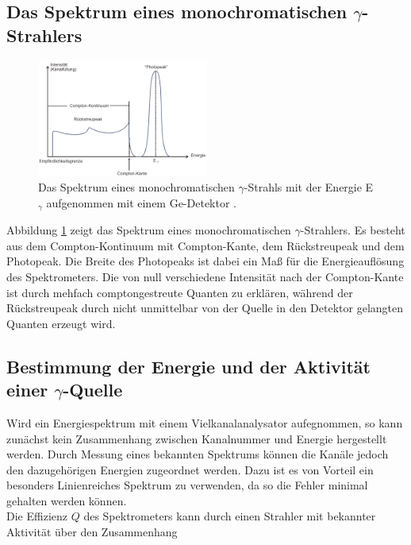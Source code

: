 \FloatBarrier

\subsection{Das Spektrum eines monochromatischen $\gamma$-Strahlers} %
\label{sub:das_von_einem_ge_detektor_erzeugt_spektrum_eines_monochromatischen_gamma_strahlers}

\begin{figure}
	\centering
	\includegraphics[width = 0.5\textwidth]{pic/spek.png}
	\caption{Das Spektrum eines monochromatischen $\gamma$-Strahls mit der Energie E$_\gamma$ aufgenommen mit einem Ge-Detektor \cite{anleitung}.}
	\label{spek}
\end{figure}

Abbildung \ref{spek} zeigt das Spektrum eines monochromatischen $\gamma$-Strahlers.
Es besteht aus dem Compton-Kontinuum mit Compton-Kante, dem Rückstreupeak und dem Photopeak.
Die Breite des Photopeaks ist dabei ein Maß für die Energieauflösung des Spektrometers.
Die von null verschiedene Intensität nach der Compton-Kante ist durch mehfach comptongestreute Quanten zu erklären,
während der Rückstreupeak durch nicht unmittelbar von der Quelle in den Detektor gelangten Quanten erzeugt wird.
\FloatBarrier
\subsection{Bestimmung der Energie und der Aktivität einer $\gamma$-Quelle} %
\label{sub:bestimmung_der_energie_und_der_aktivität_einer_gamma_quelle}

Wird ein Energiespektrum mit einem Vielkanalanalysator aufegnommen, so kann zunächst kein Zusammenhang zwischen Kanalnummer und Energie hergestellt werden.
Durch Messung eines bekannten Spektrums können die Kanäle jedoch den dazugehörigen Energien zugeordnet werden.
Dazu ist es von Vorteil ein besonders Linienreiches Spektrum zu verwenden, da so die Fehler minimal gehalten werden können.
\\
Die Effizienz $Q$ des Spektrometers kann durch einen Strahler mit bekannter Aktivität über den Zusammenhang

